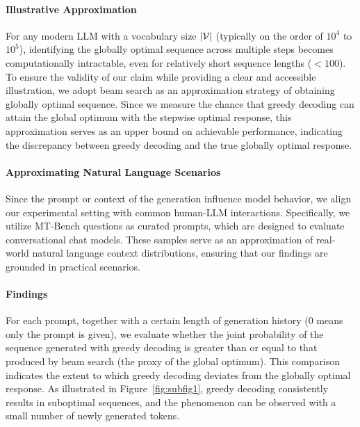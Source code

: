 \paragraph{Illustrative Approximation}
For any modern LLM with a vocabulary size $|\mathcal{V}|$ (typically on the order of $10^4$ to $10^5$), identifying the globally optimal sequence across multiple steps becomes computationally intractable, even for relatively short sequence lengths ($<100$).
To ensure the validity of our claim while providing a clear and accessible illustration, we adopt beam search as an approximation strategy of obtaining globally optimal sequence.
Since we measure the chance that greedy decoding can attain the global optimum with the stepwise optimal response, this approximation serves as an upper bound on achievable performance, indicating the discrepancy between greedy decoding and the true globally optimal response.

\paragraph{Approximating Natural Language Scenarios}
Since the prompt or context of the generation influence model behavior, we align our experimental setting with common human-LLM interactions.
Specifically, we utilize MT-Bench \citep{zheng2023judging} questions as curated prompts, which are designed to evaluate conversational chat models.
These samples serve as an approximation of real-world natural language context distributions, ensuring that our findings are grounded in practical scenarios.


\paragraph{Findings}
For each prompt, together with a certain length of generation history ($0$ means only the prompt is given), we evaluate whether the joint probability of the sequence generated with greedy decoding is greater than or equal to that produced by beam search (the proxy of the global optimum).
This comparison indicates the extent to which greedy decoding deviates from the globally optimal response.
As illustrated in Figure~\ref{fig:subfig1}, greedy decoding consistently results in suboptimal sequences, and the phenomenon can be observed with a small number of newly generated tokens.

